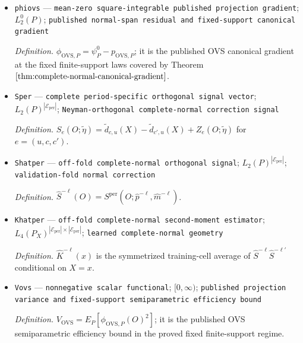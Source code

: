 \documentclass{article}
\begin{document}
\begin{itemize}
  \par\smallskip\noindent\emph{Definition.} \(p_{\mathrm{OVS},P}=r_{\mathrm{OVS},P}(X)'K_{\mathrm{OVS},P}(X)^\dagger Z_P^{\mathrm{OVS}}\); at fixed finite-support laws covered by Theorem \(\ref{thm:observable-equivalence}\), it is the orthogonal projection of the reference gradient onto the published tangent normal.
  \item \texttt{phiovs} --- \texttt{mean-\allowbreak{}zero square-\allowbreak{}integrable published projection gradient}; \(L_2^0(P)\); \texttt{published normal-\allowbreak{}span residual and fixed-\allowbreak{}support canonical gradient}
  \par\smallskip\noindent\emph{Definition.} \(\phi_{\mathrm{OVS},P}=\psi_P^0-p_{\mathrm{OVS},P}\); it is the published OVS canonical gradient at the fixed finite-support laws covered by Theorem \(\ref{thm:complete-normal-canonical-gradient}\).
  \item \texttt{Sper} --- \texttt{complete period-\allowbreak{}specific orthogonal signal vector}; \(L_2(P)^{|\mathcal E_{\mathrm{per}}|}\); \texttt{Neyman-\allowbreak{}orthogonal complete-\allowbreak{}normal correction signal}
  \par\smallskip\noindent\emph{Definition.} \(S_e(O;\widetilde\eta)=\widetilde d_{c,u}(X)-\widetilde d_{c',u}(X)+Z_e(O;\widetilde\eta)\) for \(e=(u,c,c')\).
  \item \texttt{Shatper} --- \texttt{off-\allowbreak{}fold complete-\allowbreak{}normal orthogonal signal}; \(L_2(P)^{|\mathcal E_{\mathrm{per}}|}\); \texttt{validation-\allowbreak{}fold normal correction}
  \par\smallskip\noindent\emph{Definition.} \(\widehat S^{-\ell}(O)=S^{\mathrm{per}}(O;\widehat p^{-\ell},\widehat m^{-\ell})\).
  \item \texttt{Khatper} --- \texttt{off-\allowbreak{}fold complete-\allowbreak{}normal second-\allowbreak{}moment estimator}; \(L_4(P_X)^{|\mathcal E_{\mathrm{per}}|\times|\mathcal E_{\mathrm{per}}|}\); \texttt{learned complete-\allowbreak{}normal geometry}
  \par\smallskip\noindent\emph{Definition.} \(\widehat K^{-\ell}(x)\) is the symmetrized training-cell average of \(\widehat S^{-\ell}\widehat S^{-\ell\prime}\) conditional on \(X=x\).
  \item \texttt{Vovs} --- \texttt{nonnegative scalar functional}; \([0,\infty)\); \texttt{published projection variance and fixed-\allowbreak{}support semiparametric efficiency bound}
  \par\smallskip\noindent\emph{Definition.} \(V_{\mathrm{OVS}}=E_P[\phi_{\mathrm{OVS},P}(O)^2]\); it is the published OVS semiparametric efficiency bound in the proved fixed finite-support regime.

\end{itemize}
\end{document}
